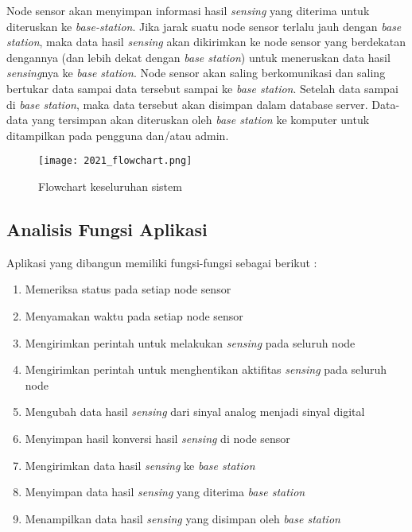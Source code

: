      Node sensor akan menyimpan informasi hasil \textit{sensing} yang diterima untuk diteruskan ke \textit{base-station}. Jika jarak suatu node sensor terlalu jauh dengan \textit{base station}, maka data hasil \textit{sensing} akan dikirimkan ke node sensor yang berdekatan dengannya (dan lebih dekat dengan \textit{base station}) untuk meneruskan data hasil \textit{sensing}nya ke \textit{base station}. Node sensor akan saling berkomunikasi dan saling bertukar data sampai data tersebut sampai ke \textit{base station}. Setelah data sampai di \textit{base station}, maka data tersebut akan disimpan dalam database server. Data-data yang tersimpan akan diteruskan oleh \textit{base station} ke komputer untuk ditampilkan pada pengguna dan/atau admin. 


    \begin{figure}[H]
    	\centering  
    	\texttt{[image: 2021\_flowchart.png]}  
    	\caption[Flowchart keseluruhan sistem]{Flowchart keseluruhan sistem} 
    	\label{fig:Flowchart keseluruhan sistem} 
    \end{figure}

\subsection{Analisis Fungsi Aplikasi} \label{Analisis Fungsi Aplikasi}
Aplikasi yang dibangun memiliki fungsi-fungsi sebagai berikut :
\begin{enumerate}
    \item Memeriksa status pada setiap node sensor
    \item Menyamakan waktu pada setiap node sensor
    \item Mengirimkan perintah untuk melakukan \textit{sensing} pada seluruh node
    \item Mengirimkan perintah untuk menghentikan aktifitas \textit{sensing} pada seluruh node
    \item Mengubah data hasil \textit{sensing} dari sinyal analog menjadi sinyal digital
    \item Menyimpan hasil konversi hasil \textit{sensing} di node sensor
    \item Mengirimkan data hasil \textit{sensing} ke \textit{base station}
    \item Menyimpan data hasil \textit{sensing} yang diterima \textit{base station}
    \item Menampilkan data hasil \textit{sensing} yang disimpan oleh \textit{base station}
\end{enumerate}

